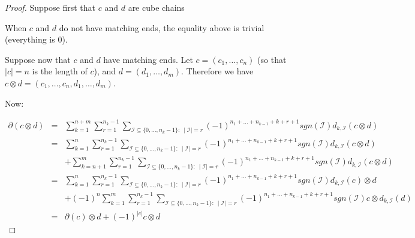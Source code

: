 \documentclass{article}
\begin{document}
\begin{proof}
Suppose first that $c$ and $d$ are cube chains

When $c$ and $d$ do not have matching ends, the equality above is trivial (everything is 0).

Suppose now that $c$ and $d$ have matching ends. 
Let $c=(c_1,\ldots,c_n)$ (so that $|c|=n$ is the length of $c$), and $d=(d_1,\ldots,d_m)$. Therefore we have $c\otimes d=(c_1,\ldots,c_n,d_1,\ldots,d_m)$.

Now: 

$$
\begin{array}{rcl}
{\scriptstyle \partial (c\otimes d)} & {\scriptstyle =} &\sum\limits_{k=1}^{n+m} \sum\limits_{r=1}^{n_k-1} \sum\limits_{\scriptscriptstyle \mathcal{I} \subseteq\{0,\ldots,n_k-1\}: \ \mid \mathcal{I} \mid=r}
{\scriptstyle (-1)^{\scriptscriptstyle n_1+\ldots+n_{k-1}+k+r+1} sgn(\mbox{$\scriptstyle \mathcal{I}$}) d_{k,\mbox{$\scriptscriptstyle \mathcal{I}$}}(c\otimes d)} \\
& {\scriptstyle =} & \sum\limits_{k=1}^{n} \sum\limits_{r=1}^{n_k-1} \sum\limits_{\scriptscriptstyle \mathcal{I} \subseteq\{0,\ldots,n_k-1\}: \ \mid \mathcal{I} \mid=r}
{\scriptstyle (-1)^{\scriptscriptstyle n_1+\ldots+n_{k-1}+k+r+1} sgn(\mbox{$\scriptstyle \mathcal{I}$}) d_{k,\mbox{$\scriptscriptstyle \mathcal{I}$}}(c\otimes d)} \\
& & +\sum\limits_{k=n+1}^{m} \sum\limits_{r=1}^{n_k-1} \sum\limits_{\scriptscriptstyle \mathcal{I} \subseteq\{0,\ldots,n_k-1\}: \ \mid \mathcal{I} \mid=r} 
{\scriptstyle (-1)^{\scriptscriptstyle n_1+\ldots+n_{k-1}+k+r+1}
sgn(\mbox{$\scriptstyle \mathcal{I}$}) d_{k,\mbox{$\scriptscriptstyle \mathcal{I}$}}
 (c\otimes d)} \\ 
& {\scriptstyle =} & \sum\limits_{k=1}^{n} \sum\limits_{r=1}^{n_k-1} \sum\limits_{\scriptscriptstyle \mathcal{I} \subseteq\{0,\ldots,n_k-1\}: \ \mid \mathcal{I} \mid=r}
{\scriptstyle (-1)^{\scriptscriptstyle n_1+\ldots+n_{k-1}+k+r+1} sgn(\mbox{$\scriptstyle \mathcal{I}$}) d_{k,\mbox{$\scriptscriptstyle \mathcal{I}$}}(c)\otimes d} \\
& & +(-1)^n \sum\limits_{k=1}^{m} \sum\limits_{r=1}^{n_k-1} \sum\limits_{\scriptscriptstyle \mathcal{I} \subseteq\{0,\ldots,n_k-1\}: \ \mid \mathcal{I} \mid=r}
{\scriptstyle (-1)^{\scriptscriptstyle n_1+\ldots+n_{k-1}+k+r+1} sgn(\mbox{$\scriptstyle \mathcal{I}$}) c\otimes d_{k,\mbox{$\scriptscriptstyle \mathcal{I}$}}(d)} \\
& {\scriptstyle =} & {\scriptstyle \partial(c)\otimes d +(-1)^{|c|}c\otimes d}
\end{array}
$$
%
\end{proof}
\end{document}
